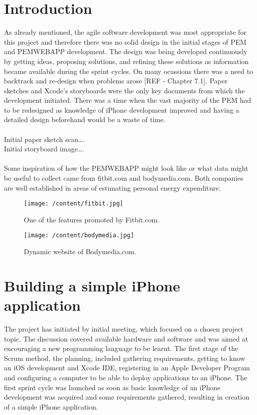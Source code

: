 \documentclass[12pt, a4paper]{report}   %
\begin{document}
\begin{enumerate}
\section{Introduction}
As already mentioned, the agile software development was most appropriate for this project and therefore there was no solid design in the initial stages of PEM and PEMWEBAPP development.
The design was being developed continuously by getting ideas, proposing solutions, and refining these solutions as information became available during the sprint cycles. On many ocassions there was a need to backtrack and re-design when problems arose [REF - Chapter 7.1]. Paper sketches and Xcode's storyboards were the only key documents from which the development initiated. There was a time when the vast majority of the PEM had to be redesigned as knowledge of iPhone development improved and having a detailed design beforehand would be a waste of time.\\ \\
Initial paper sketch scan….\\
Initial storyboard image….\\ \\
Some inspiration of how the PEMWEBAPP might look like or what data might be useful to collect came from fitbit.com and bodymedia.com. Both companies are well established in areas of estimating personal energy expenditure.

\begin{figure}[H]
  \centering
	\texttt{[image: /content/fitbit.jpg]}
	  \caption{One of the features promoted by Fitbit.com.}
\end{figure}

\begin{figure}[H]
  \centering
	\texttt{[image: /content/bodymedia.jpg]}
	  \caption{Dynamic website of Bodymedia.com.}
\end{figure}

\clearpage
\section{Building a simple iPhone application}
The project has initiated by initial meeting, which focused on a chosen project topic. The discussion covered available hardware and software and was aimed at encouraging a new programming language to be learnt. The first stage of the Scrum method, the planning, included gathering requirements, getting to know an iOS development and Xcode IDE, registering in an Apple Developer Program and configuring a computer to be able to deploy applications to an iPhone. The first sprint cycle was launched as soon as basic knowledge of an iPhone development was acquired and some requirements gathered, resulting in creation of a simple iPhone application.


\end{enumerate}
\end{document}

